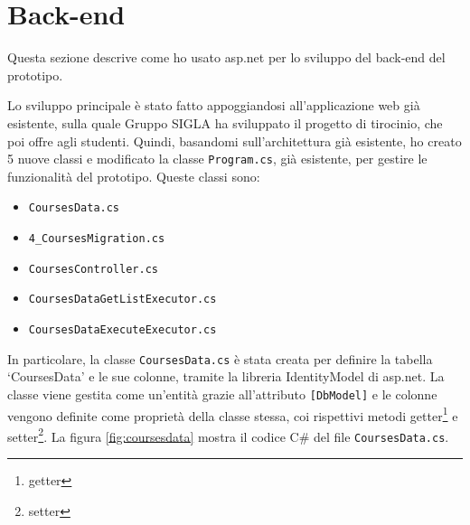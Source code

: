  
\section{Back-end}\label{sec:back-end}
Questa sezione descrive come ho usato \acrshort{asp.net} per lo sviluppo del back-end del prototipo.

Lo sviluppo principale è stato fatto appoggiandosi all'applicazione web già esistente, sulla quale Gruppo SIGLA ha sviluppato il progetto di tirocinio, che poi offre agli studenti. Quindi, basandomi sull'architettura già esistente, ho creato 5 nuove classi e modificato la classe \texttt{Program.cs}, già esistente, per gestire le funzionalità del prototipo. Queste classi sono:
\begin{itemize}
  \item \texttt{CoursesData.cs}
  \item \texttt{4\_CoursesMigration.cs}
  \item \texttt{CoursesController.cs}
  \item \texttt{CoursesDataGetListExecutor.cs}
  \item \texttt{CoursesDataExecuteExecutor.cs}
\end{itemize}

In particolare, la classe \texttt{CoursesData.cs} è stata creata per definire la tabella `CoursesData' e le sue colonne, tramite la libreria IdentityModel di \acrshort{asp.net}. La classe viene gestita come un'entità grazie all'attributo \texttt{[DbModel]} e le colonne vengono definite come proprietà della classe stessa, coi rispettivi metodi getter\footnote{\glsdesc{getter}} e setter\footnote{\glsdesc{setter}}.
La figura \ref{fig:coursesdata} mostra il codice C\# del file \texttt{CoursesData.cs}.

